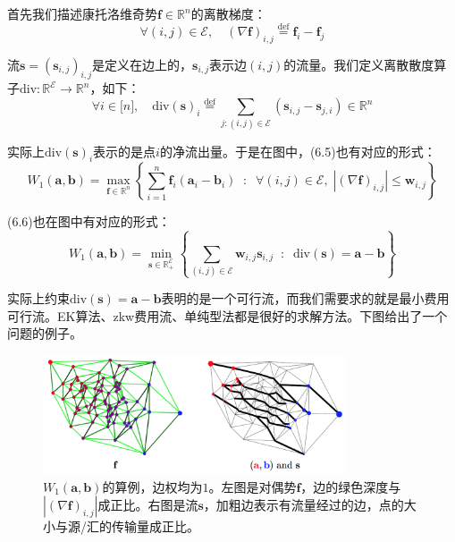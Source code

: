 \documentclass[cn,10pt,math=newtx,citestyle=gb7714-2015,bibstyle=gb7714-2015]{elegantbook}
\begin{document}
首先我们描述康托洛维奇势$\mathbf{f}\in\mathbb{R}^n$的离散梯度：
\begin{equation*}
    \forall (i,j)\in\mathcal{E}, \quad (\nabla \mathbf{f})_{i,j} \overset{\text{def}}{=} \mathbf{f}_i-\mathbf{f}_j
\end{equation*}

流$\mathbf{s}=(\mathbf{s}_{i,j})_{i,j}$是定义在边上的，$\mathbf{s}_{i,j}$表示边$(i,j)$的流量。我们定义离散散度算子$\text{div}:\mathbb{R}^\mathcal{E} \to \mathbb{R}^n$，如下：
\begin{equation*}
    \forall i\in\mathbb{[}n\mathbb{]},\quad \text{div}(\mathbf{s})_i \overset{\text{def}}{=} \sum_{j:(i,j)\in\mathcal{E}} (\mathbf{s}_{i,j}-\mathbf{s}_{j,i})\in\mathbb{R}^n
\end{equation*}

实际上$\text{div}(\mathbf{s})_i$表示的是点$i$的净流出量。于是在图中，(6.5)也有对应的形式：
\begin{equation}
    W_1(\mathbf{a,b}) = \max_{\mathbf{f}\in\mathbb{R}^n} \left\{ \sum_{i=1}^n \mathbf{f}_i(\mathbf{a}_i-\mathbf{b}_i) \;\; : \;\; \forall (i,j)\in\mathcal{E}, \; |(\nabla \mathbf{f})_{i,j}|\leq \mathbf{w}_{i,j} \right\}
\end{equation}

(6.6)也在图中有对应的形式：
\begin{equation}
    W_1(\mathbf{a,b}) = \min_{\mathbf{s}\in\mathbb{R}_+^\mathcal{E}} \left\{ \sum_{(i,j)\in\mathcal{E}} \mathbf{w}_{i,j}\mathbf{s}_{i,j} \;\; : \;\; \text{div}(\mathbf{s})=\mathbf{a}-\mathbf{b} \right\}
\end{equation}

实际上约束$\text{div}(\mathbf{s})=\mathbf{a}-\mathbf{b}$表明的是一个可行流，而我们需要求的就是最小费用可行流。EK算法、zkw费用流、单纯型法都是很好的求解方法。下图给出了一个问题的例子。

\begin{figure}[H]
    \centering
    \includegraphics[width=0.8\textwidth]{figure/fig6.1.png}
    \caption{$W_1(\mathbf{a,b})$的算例，边权均为$1$。左图是对偶势$\mathbf{f}$，边的绿色深度与$|(\nabla \mathbf{f})_{i,j}|$成正比。右图是流$\mathbf{s}$，加粗边表示有流量经过的边，点的大小与源/汇的传输量成正比。}
    \label{图6.1}
\end{figure}
\end{document}
